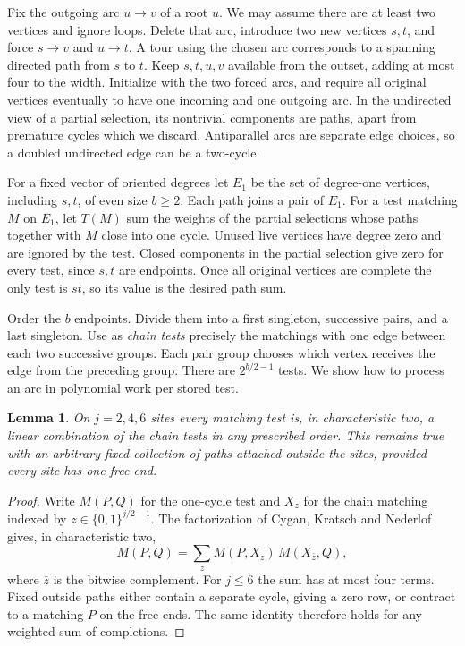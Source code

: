 \documentclass[11pt]{article}
\newtheorem{lemma}[theorem]{Lemma}
\theoremstyle{definition}
\newcommand{\bits}{\{0,1\}}
\begin{document}
Fix the outgoing arc \(u\to v\) of a root \(u\). We may assume there are at least two vertices and ignore loops. Delete that arc, introduce two new vertices \(s,t\), and force \(s\to v\) and \(u\to t\). A tour using the chosen arc corresponds to a spanning directed path from \(s\) to \(t\). Keep \(s,t,u,v\) available from the outset, adding at most four to the width. Initialize with the two forced arcs, and require all original vertices eventually to have one incoming and one outgoing arc. In the undirected view of a partial selection, its nontrivial components are paths, apart from premature cycles which we discard. Antiparallel arcs are separate edge choices, so a doubled undirected edge can be a two-cycle.

For a fixed vector of oriented degrees let \(E_1\) be the set of degree-one vertices, including \(s,t\), of even size \(b\ge2\). Each path joins a pair of \(E_1\). For a test matching \(M\) on \(E_1\), let \(T(M)\) sum the weights of the partial selections whose paths together with \(M\) close into one cycle. Unused live vertices have degree zero and are ignored by the test. Closed components in the partial selection give zero for every test, since \(s,t\) are endpoints. Once all original vertices are complete the only test is \(st\), so its value is the desired path sum.

Order the \(b\) endpoints. Divide them into a first singleton, successive pairs, and a last singleton. Use as \emph{chain tests} precisely the matchings with one edge between each two successive groups. Each pair group chooses which vertex receives the edge from the preceding group. There are \(2^{b/2-1}\) tests. We show how to process an arc in polynomial work per stored test.

\begin{lemma}\label{lem:localbasis}
On \(j=2,4,6\) sites every matching test is, in characteristic two, a linear combination of the chain tests in any prescribed order. This remains true with an arbitrary fixed collection of paths attached outside the sites, provided every site has one free end.
\end{lemma}
\begin{proof}
Write \(M(P,Q)\) for the one-cycle test and \(X_z\) for the chain matching indexed by \(z\in\bits^{j/2-1}\). The factorization of Cygan, Kratsch and Nederlof~\cite[Theorem~3.4]{ckn} gives, in characteristic two,
\[
 M(P,Q)=\sum_z M(P,X_z)\,M(X_{\bar z},Q),
\]
where \(\bar z\) is the bitwise complement. For \(j\le6\) the sum has at most four terms. Fixed outside paths either contain a separate cycle, giving a zero row, or contract to a matching \(P\) on the free ends. The same identity therefore holds for any weighted sum of completions.
\end{proof}
\end{document}
